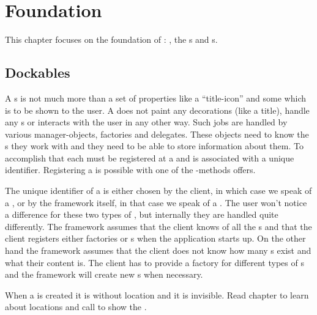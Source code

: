 \section{Foundation}
This chapter focuses on the foundation of : , the s and s.

\subsection{Dockables}
A s is not much more than a set of properties like a ``title-icon'' and some  which is to be shown to the user. A  does not paint any decorations (like a title), handle any s or interacts with the user in any other way. Such jobs are handled by various manager-objects, factories and delegates. These objects need to know the s they work with and they need to be able to store information about them. To accomplish that each  must be registered at a  and is associated with a unique identifier. Registering a  is possible with one of the -methods  offers.

The unique identifier of a  is either chosen by the client, in which case we speak of a , or by the framework itself, in that case we speak of a . The user won't notice a difference for these two types of , but internally they are handled quite differently. The framework assumes that the client knows of all the s and that the client registers either factories or s when the application starts up. On the other hand the framework assumes that the client does not know how many s exist and what their content is. The client has to provide a factory for different types of s and the framework will create new s when necessary.

When a  is created it is without location and it is invisible. Read chapter  to learn about locations and call  to show the .


